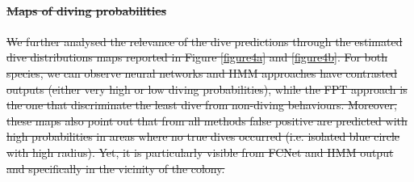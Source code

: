 \documentclass{article}
\providecommand{\DIFdeltex}[1]{{\protect\color{red}\sout{#1}}}                      %
\providecommand{\DIFdelbegin}{} %
\providecommand{\DIFdel}[1]{\texorpdfstring{\DIFdeltex{#1}}{}} %
\newcommand{\DIFscaledelfig}{0.5}
\newlength{\DIFdelgraphicswidth} %
\newlength{\DIFdelgraphicsheight} %
\newcommand{\DIFdelincludegraphics}[2][]{%
\sbox{\DIFdelgraphicsbox}{\DIFOincludegraphics[#1]{#2}}%
\settoboxwidth{\DIFdelgraphicswidth}{\DIFdelgraphicsbox} %
\settoboxtotalheight{\DIFdelgraphicsheight}{\DIFdelgraphicsbox} %
\scalebox{\DIFscaledelfig}{%
\parbox[b]{\DIFdelgraphicswidth}{\usebox{\DIFdelgraphicsbox}\\[-\baselineskip] \rule{\DIFdelgraphicswidth}{0em}}\llap{\resizebox{\DIFdelgraphicswidth}{\DIFdelgraphicsheight}{%
\setlength{\unitlength}{\DIFdelgraphicswidth}%
\begin{picture}(1,1)%
\thicklines\linethickness{2pt} %
{\color[rgb]{1,0,0}\put(0,0){\framebox(1,1){}}}%
{\color[rgb]{1,0,0}\put(0,0){\line( 1,1){1}}}%
{\color[rgb]{1,0,0}\put(0,1){\line(1,-1){1}}}%
\end{picture}%
}\hspace*{3pt}}} %
} %
\DeclareRobustCommand{\DIFdelbegin}{\DIFOdelbegin \let\includegraphics\DIFdelincludegraphics} %
\begin{document}
\DIFdelbegin \paragraph{\DIFdel{Maps of diving probabilities}}
\addtocounter{paragraph}{-1}%
\DIFdel{We further analysed the relevance of the dive predictions through the estimated dive distributions maps reported in Figure \ref{figure4a} and \ref{figure4b}. For both species, we can observe neural networks and HMM approaches have contrasted outputs (either very high or low diving probabilities), while the FPT approach is the one that discriminate the least dive from non-diving behaviours. Moreover, these maps also point out that from all methods false positive are predicted with high probabilities in areas where no true dives occurred (i.e. isolated blue circle with high radius). Yet, it is particularly visible from FCNet and HMM output and specifically in the vicinity of the colony.
}%

\end{document}
